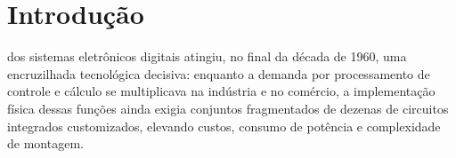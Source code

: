 
\section{Introdução}
\label{sec:introducao}

 dos sistemas eletrônicos digitais atingiu, no final da década de 1960, uma encruzilhada tecnológica decisiva: enquanto a demanda por processamento de controle e cálculo se multiplicava na indústria e no comércio, a implementação física dessas funções ainda exigia conjuntos fragmentados de dezenas de circuitos integrados customizados, elevando custos, consumo de potência e complexidade de montagem.



